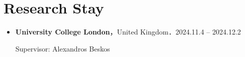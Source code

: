 \documentclass[
  11pt,
]{article}
\renewcommand{\labelitemi}{\textcolor{minty}{\faCheckCircle}} %
\begin{document}
\renewcommand{\labelitemi}{\textcolor{minty}{\faUniversity}}

\section{Research Stay}\label{research-stay}

\begin{itemize}
\item
  \textbf{University College London}，United Kingdom．\hfill {2024.11.4
  -- 2024.12.2}

  Supervisor: Alexandros Beskos
\end{itemize}

\renewcommand{\labelitemi}{\textcolor{minty}{\faBookmark}}
\end{document}

